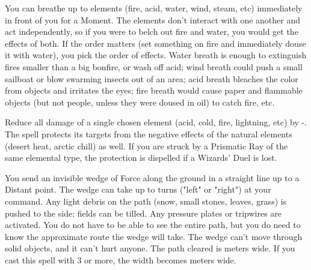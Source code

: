 {\SPELL[
  Name=Pritchard's Gusty Belch,
  Link=wizardry-pritchards-gusty-belch,
  Paradigm=Biomancy,
  Save=N,
  Duration=0,
  Counter=n/a ,
  Keywords=None,
  Target=Close and Nearby Area
]



You can breathe up to \DICE elements (fire, acid, water, wind, steam, etc)
immediately in front of you for a Moment.  The elements don't interact with
one another and act independently, so if you were to belch out fire and
water, you would get the effects of both.  If the order matters (set
something on fire and immediately douse it with water), you pick the order
of effects.  Water breath is enough to extinguish fires smaller than a big
bonfire, or wash off acid; wind breath could push a small sailboat or blow
swarming insects out of an area; acid breath bleaches the color from objects
and irritates the eyes; fire breath would cause paper and flammable objects
(but not people, unless they were doused in oil) to catch fire, etc.




\SPELL[
  Name=Protection from Element,
  Link=wizardry-protection-from-element,
  Paradigm=Elements,
  Save=N,
  Duration=Session,
  Counter=\mylink{Prismatic Ray}{wizardry-prismatic-ray} ,
  Keywords=None,
  Target=Self or Close Ally
]



Reduce all damage of a single chosen element (acid, cold, fire, lightning,
etc) by -\DICE.  The spell protects its targets from the negative effects of
the natural elements (desert heat, arctic chill) as well.  If you are struck
by a Prismatic Ray of the same elemental type, the protection is dispelled
if a Wizards' Duel is lost.





\SPELL[
  Name=Rhea's Efficacious Plow,
  Link=wizardry-rheas-efficacious-plow,
  Paradigm=Force,
  Save=N,
  Duration=Moments,
  Counter=n/a ,
  Keywords=None,
  Target=See description
]



You send an invisible wedge of Force along the ground in a straight line up
to a Distant point.  The wedge can take up to \DICE turns ("left" or
"right") at your command.  Any light debris on the path (snow, small stones,
leaves, grass) is pushed to the side; fields can be tilled. Any pressure
plates or tripwires are activated. You do not have to be able to see the
entire path, but you do need to know the approximate route the wedge will
take. The wedge can't move through solid objects, and it can't hurt anyone.
The path cleared is \DICE meters wide. If you cast this spell with 3 \DICE
or more, the width becomes \SUMDICE meters wide.




}

